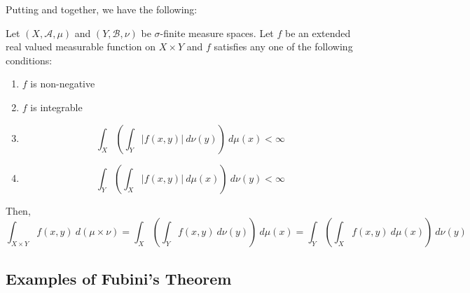 
Putting  and  together, we have the following:

\begin{theorem}[Fubini]
    Let $(X,\mathscr A,\mu)$ and $(Y,\mathscr B,\nu)$ be $\sigma$-finite measure spaces. Let $f$ be an extended real valued measurable function on $X\times Y$ and $f$ satisfies any one of the following conditions: 
    \begin{enumerate}[label=(\alph*)]
    \item $f$ is non-negative 
    \item $f$ is integrable 
    \item 
    \begin{equation*}
        \int_X\left(\int_Y|f(x,y)|~d\nu(y)\right)~d\mu(x) < \infty
    \end{equation*}
    \item 
    \begin{equation*}
        \int_Y\left(\int_X|f(x,y)|~d\mu(x)\right)~d\nu(y) < \infty
    \end{equation*}
    \end{enumerate}
    Then, 
    \begin{equation*}
        \int_{X\times Y}f(x,y)~d(\mu\times\nu) = \int_X\left(\int_Yf(x,y)~d\nu(y)\right)~d\mu(x) = \int_Y\left(\int_Xf(x,y)~d\mu(x)\right)~d\nu(y)
    \end{equation*}
\end{theorem}

\subsection*{Examples of Fubini's Theorem}

